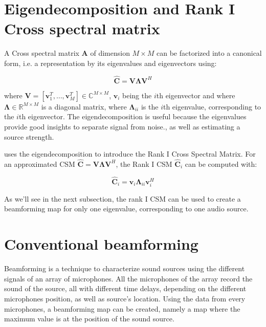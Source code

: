 \documentclass[11pt,a4paper,twoside]{report}
\begin{document}
\section{Eigendecomposition and Rank I Cross spectral matrix}

A Cross spectral matrix $\mathbf{A}$ of dimension $M \times M$ can be factorized into a canonical form, i.e. a representation by its eigenvalues and eigenvectors using:

\begin{equation}
    \label{eigendecomposition}
    \hat{\mathbf{C}} = \mathbf{V} \mathbf{\Lambda} \mathbf{V}^H
\end{equation}

where $\mathbf{V} = [\mathbf{v}_1^T, \dots, \mathbf{v}_M^T] \in \mathbb{C}^{M \times M}$, $\mathbf{v}_i$ being the $i$th eigenvector and where $\mathbf{\Lambda} \in \mathbb{R}^{M \times M}$ is a diagonal matrix, where $\mathbf{\Lambda}_{ii}$ is the $i$th eigenvalue, corresponding to the $i$th eigenvector. The eigendecomposition is useful because the eigenvalues provide good insights to separate signal from noise., as well as estimating a source strength. 

\cite{sarradj2010fast} uses the eigendecomposition to introduce the Rank I Cross Spectral Matrix. For an approximated CSM $\hat{\mathbf{C}} = \mathbf{V} \mathbf{\Lambda} \mathbf{V}^H$, the Rank I CSM $\hat{\mathbf{C}}_i$ can be computed with:

\begin{equation}
    \label{rank_I_csm}
    \hat{\mathbf{C}}_i = \mathbf{v}_i \mathbf{\Lambda}_{ii} \mathbf{v}_{i}^{H}
\end{equation}

As we'll see in the next subsection, the rank I CSM can be used to create a beamforming map for only one eigenvalue, corresponding to one audio source. 

\section{Conventional beamforming}

Beamforming is a technique to characterize sound sources using the different signals of an array of microphones. All the microphones of the array record the sound of the source, all with different time delays, depending on the different microphones position, as well as source's location. Using the data from every microphones, a beamforming map can be created, namely a map where the maximum value is at the position of the sound source.
\end{document}
